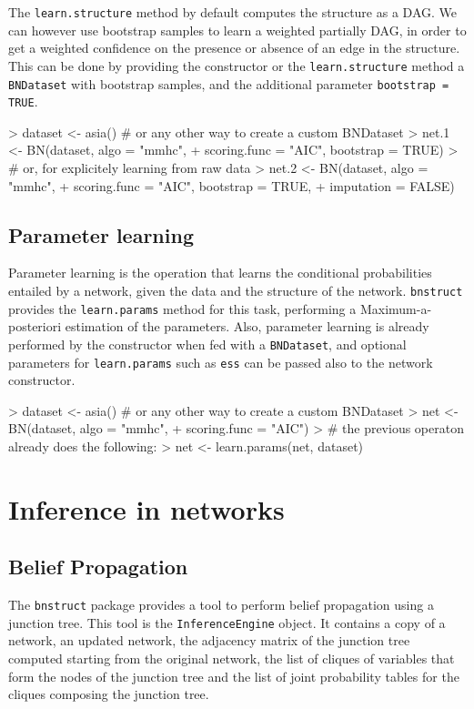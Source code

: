 \documentclass{article}
\newcommand{\Robject}[1]{{\texttt{#1}}}
\newcommand{\Rpackage}[1]{{\texttt{#1}}}
\newcommand{\Rmethod}[1]{{\texttt{#1}}}
\newcommand{\Rfunarg}[1]{{\texttt{#1}}}
\begin{document}
The \Rmethod{learn.structure} method by default computes the structure as a DAG. We can however use
bootstrap samples to learn a weighted partially DAG, in order to get a weighted confidence on the presence or
absence of an edge in the structure. This can be done by providing the constructor or the \Rmethod{learn.structure}
method a \Robject{BNDataset} with bootstrap samples, and the additional parameter \Rfunarg{bootstrap = TRUE}.
\begin{Schunk}
\begin{Sinput}
> dataset <- asia() # or any other way to create a custom BNDataset
> net.1   <- BN(dataset, algo = "mmhc",
+               scoring.func = "AIC", bootstrap = TRUE)
> # or, for explicitely learning from raw data
> net.2   <- BN(dataset, algo = "mmhc",
+               scoring.func = "AIC", bootstrap = TRUE,
+               imputation = FALSE)
\end{Sinput}
\end{Schunk}

\subsection{Parameter learning}
Parameter learning is the operation that learns the conditional probabilities entailed by a network,
given the data and the structure of the network. \Rpackage{bnstruct} provides the \Rmethod{learn.params} method for this task,
performing a Maximum-a-posteriori estimation of the parameters.
Also, parameter learning is already performed by the constructor when fed with a \Robject{BNDataset}, and optional
parameters for \Rmethod{learn.params} such as \Rfunarg{ess} can be passed also to the network constructor.
\begin{Schunk}
\begin{Sinput}
> dataset <- asia() # or any other way to create a custom BNDataset
> net     <- BN(dataset, algo = "mmhc",
+               scoring.func = "AIC")
> # the previous operaton already does the following:
> net     <- learn.params(net, dataset)
\end{Sinput}
\end{Schunk}

\section{Inference in networks}
\subsection{Belief Propagation}
The \Rpackage{bnstruct} package provides a tool to perform belief propagation using a junction tree.
This tool is the \Robject{InferenceEngine} object.
It contains a copy of a network, an updated network, the adjacency matrix of the junction tree computed
starting from the original network, the list of cliques of variables that form the nodes of the junction tree
and the list of joint probability tables for the cliques composing the junction tree.
\end{document}
